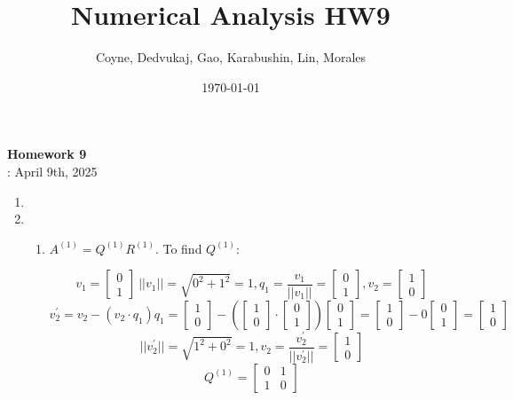 \documentclass[12pt]{article}
\title{Numerical Analysis HW9}
\author{Coyne, Dedvukaj, Gao, Karabushin, Lin, Morales}
\date{\today}
\begin{document}
\pagestyle{fancy}


\begin{center}
\textbf{\Large Homework 9} \\
: April 9th, 2025
\end{center}

\begin{enumerate}[leftmargin=0em]
    \item
    
    \item
    \begin{enumerate}[leftmargin=!]
        \item
        \(A^{(1)} = Q^{(1)}R^{(1)}\). To find $Q^{(1)}$:
        
        \[v_{1}=\left[\begin{matrix}0\\ 1\end{matrix}\right]\
        ||v_{1}||=\sqrt{0^{2}+1^{2}}=1, 
        q_{1}=\frac{v_{1}}{||v_{1}||}=\left[\begin{matrix}0\\ 1\end{matrix}\right], 
        v_{2}=\left[\begin{matrix}1\\ 0\end{matrix}\right]\]
        \[v_{2}^{\prime }=v_{2}-(v_{2}\cdot q_{1})q_{1}=
        \left[\begin{matrix}1\\ 0\end{matrix}\right]-(\left[\begin{matrix}1\\ 0\end{matrix}\right]\cdot
        \left[\begin{matrix}0\\ 1\end{matrix}\right])
        \left[\begin{matrix}0\\ 1\end{matrix}\right]=
        \left[\begin{matrix}1\\ 0\end{matrix}\right]-0
        \left[\begin{matrix}0\\ 1\end{matrix}\right]=
        \left[\begin{matrix}1\\ 0\end{matrix}\right]\]
        \[||v_{2}^{\prime }||=\sqrt{1^{2}+0^{2}}=1, 
        v_{2}=\frac{v_{2}^{\prime }}{||v_{2}^{\prime }||}=\left[\begin{matrix}1\\ 0\end{matrix}\right]\]
        \[Q^{(1)}=\left[\begin{matrix}0&1\\ 1&0\end{matrix}\right]\]


\end{enumerate}
\end{enumerate}
\end{document}
